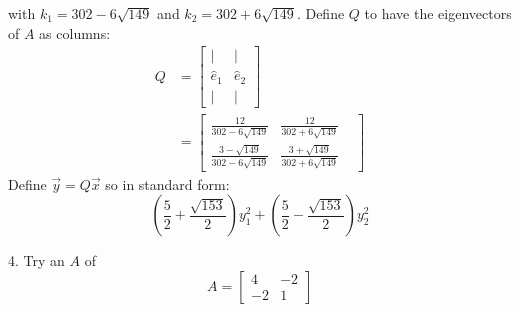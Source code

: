 \documentclass[11pt]{homework}
\begin{document}
with $k_1 = 302 - 6 \sqrt{149}$ and $k_2=302+6\sqrt{149}$.
Define $Q$ to have the eigenvectors of $A$ as columns:
\begin{align*}
  Q &=
  \begin{bmatrix}
    | & | \\
    \hat e_1 & \hat e_2 \\
    | & |
  \end{bmatrix}  \\
  &=
  \begin{bmatrix}
    \frac{12}{302 - 6\sqrt{149}} & \frac{12}{302 + 6\sqrt{149}} & \\
    \frac{3 - \sqrt{149}}{302-6\sqrt{149}} & \frac{3 + \sqrt{149}}{302+6\sqrt{149}}
  \end{bmatrix}
\end{align*}
Define $\vec y = Q \vec x$ so
in standard form:
\begin{equation*}
  \left(\frac{5}{2} +\frac{\sqrt{153}}{2}\right)y_1^2 + \left(\frac{5}{2} -\frac{\sqrt{153}}{2}\right)y_2^2
\end{equation*}

4. 
Try an $A$ of
\begin{equation*}
A = 
  \begin{bmatrix}
  4 & -2 \\
  -2 & 1
  \end{bmatrix}
\end{equation*}
\end{document}
